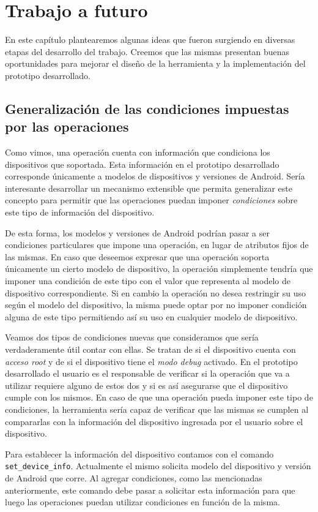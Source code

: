 \chapter{Trabajo a futuro}
En este capítulo plantearemos algunas ideas que fueron surgiendo en diversas etapas del desarrollo del trabajo. Creemos que las mismas presentan buenas oportunidades para mejorar el diseño de la herramienta y la implementación del prototipo desarrollado.

\section{Generalización de las condiciones impuestas por las operaciones}
Como vimos, una operación cuenta con información que condiciona los dispositivos que soportada. Esta información en el prototipo desarrollado corresponde únicamente a modelos de dispositivos y versiones de Android. Sería interesante desarrollar un mecanismo extensible que permita generalizar este concepto para permitir que las operaciones puedan imponer \emph{condiciones} sobre este tipo de información del dispositivo. 

De esta forma, los modelos y versiones de Android podrían pasar a ser condiciones particulares que impone una operación, en lugar de atributos fijos de las mismas. En caso que deseemos expresar que una operación soporta únicamente un cierto modelo de dispositivo, la operación simplemente tendría que imponer una condición de este tipo con el valor que representa al modelo de dispositivo correspondiente. Si en cambio la operación no desea restringir su uso según el modelo del dispositivo, la misma puede optar por no imponer condición alguna de este tipo permitiendo así su uso en cualquier modelo de dispositivo.

Veamos dos tipos de condiciones nuevas que consideramos que sería verdaderamente útil contar con ellas. Se tratan de si el dispositivo cuenta con \emph{acceso root} y de si el dispositivo tiene el \emph{modo debug} activado. En el prototipo desarrollado el usuario es el responsable de verificar si la operación que va a utilizar requiere alguno de estos dos y si es así asegurarse que el dispositivo cumple con los mismos. En caso de que una operación pueda imponer este tipo de condiciones, la herramienta sería capaz de verificar que las mismas se cumplen al compararlas con la información del dispositivo ingresada por el usuario sobre el dispositivo.

Para establecer la información del dispositivo contamos con el comando \texttt{set\_device\_info}. Actualmente el mismo solicita modelo del dispositivo y versión de Android que corre. Al agregar condiciones, como las mencionadas anteriormente, este comando debe pasar a solicitar esta información para que luego las operaciones puedan utilizar condiciones en función de la misma.

